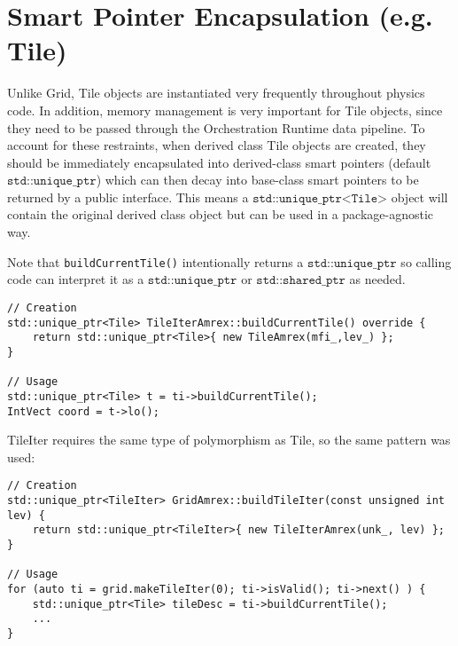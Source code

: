 \documentclass[letterpaper,12pt]{article}
\begin{document}
\section{Smart Pointer Encapsulation (e.g. Tile)}

Unlike Grid, Tile objects are instantiated very frequently throughout physics code. In addition, memory management is very important for Tile objects, since they need to be passed through the Orchestration Runtime data pipeline. To account for these restraints, when derived class Tile objects are created, they should be immediately encapsulated into derived-class smart pointers (default $\texttt{std::unique\_ptr}$) which can then decay into base-class smart pointers to be returned by a public interface. This means a $\texttt{std::unique\_ptr<Tile>}$ object will contain the original derived class object but can be used in a package-agnostic way.

Note that \texttt{buildCurrentTile()}  intentionally returns a $\texttt{std::unique\_ptr}$ so calling code can interpret it as a $\texttt{std::unique\_ptr}$ or $\texttt{std::shared\_ptr}$ as needed.

\begin{verbatim}
// Creation
std::unique_ptr<Tile> TileIterAmrex::buildCurrentTile() override {
    return std::unique_ptr<Tile>{ new TileAmrex(mfi_,lev_) };
}

// Usage
std::unique_ptr<Tile> t = ti->buildCurrentTile();
IntVect coord = t->lo();
\end{verbatim}

TileIter requires the same type of polymorphism as Tile, so the same pattern was used:
\begin{verbatim}
// Creation
std::unique_ptr<TileIter> GridAmrex::buildTileIter(const unsigned int lev) {
    return std::unique_ptr<TileIter>{ new TileIterAmrex(unk_, lev) };
}

// Usage
for (auto ti = grid.makeTileIter(0); ti->isValid(); ti->next() ) {
    std::unique_ptr<Tile> tileDesc = ti->buildCurrentTile();
    ...
}


\end{verbatim}
\end{document}
